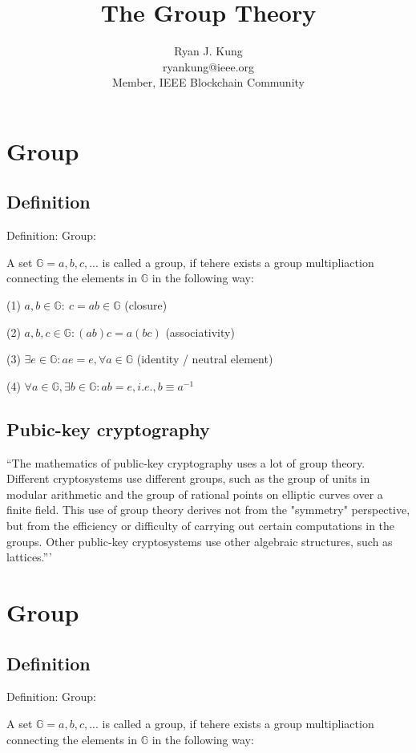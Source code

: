 \documentclass[twocolumn]{article}
\author{Ryan J. Kung \\ryankung@ieee.org\\Member, IEEE Blockchain Community }
\title{The Group Theory}
\begin{document}
\maketitle
\section{Group}
\subsection{Definition}
Definition: Group\cite{Cardelli:1996:TS:234313.234418}:

A set $\mathbb{G}={a, b, c, ...}$ is called a group, if tehere exists a group multipliaction connecting the elements in $\mathbb{G}$ in the following way:

(1) $a, b \in \mathbb{G}:\ c=a b \in \mathbb{G}$ (closure)

(2) $a, b, c \in \mathbb{G}: (ab)c=a(bc)$ (associativity)

(3) $\exists e \in \mathbb{G}: ae=e, \forall a \in \mathbb{G}$ (identity / neutral element)

(4) $\forall a \in \mathbb{G}, \exists b \in \mathbb{G}: ab=e, i.e., b\equiv a^{-1}$

\subsection{Pubic-key cryptography}
``The mathematics of public-key cryptography uses a lot of group theory. Different cryptosystems use different groups, such as the group of units in modular arithmetic and the group of rational points on elliptic curves over a finite field. This use of group theory derives not from the "symmetry" perspective, but from the efficiency or difficulty of carrying out certain computations in the groups. Other public-key cryptosystems use other algebraic structures, such as lattices.''' \cite{Cardelli:1996:TS:234313.234418}

\section{Group}
\subsection{Definition}
Definition: Group\cite{Cardelli:1996:TS:234313.234418}:

A set $\mathbb{G}={a, b, c, ...}$ is called a group, if tehere exists a group multipliaction connecting the elements in $\mathbb{G}$ in the following way:
\end{document}
